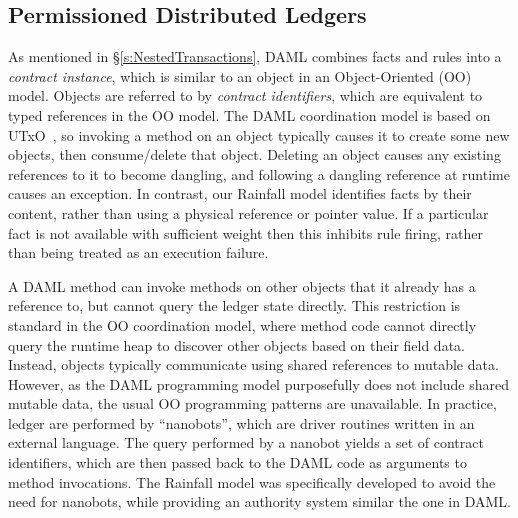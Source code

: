


\subsection{Permissioned Distributed Ledgers}
\label{s:RelatedPermissioned}
As mentioned in \S\ref{s:NestedTransactions}, DAML combines facts and rules into a \emph{contract instance}, which is similar to an object in an Object-Oriented (OO) model. Objects are referred to by \emph{contract identifiers}, which are equivalent to typed references in the OO model. The DAML coordination model is based on UTxO~\cite{Zahnentferner2018:UTxO}, so invoking a method on an object typically causes it to create some new objects, then consume/delete that object. Deleting an object causes any existing references to it to become dangling, and following a dangling reference at runtime causes an exception. In contrast, our Rainfall model identifies facts by their content, rather than using a physical reference or pointer value. If a particular fact is not available with sufficient weight then this inhibits rule firing, rather than being treated as an execution failure.

A DAML method can invoke methods on other objects that it already has a reference to, but cannot query the ledger state directly. This restriction is standard in the OO coordination model, where method code cannot directly query the runtime heap to discover other objects based on their field data. Instead, objects typically communicate using shared references to mutable data. However, as the DAML programming model purposefully does not include shared mutable data, the usual OO programming patterns are unavailable. In practice, ledger are performed by ``nanobots'', which are driver routines written in an external language. The query performed by a nanobot yields a set of contract identifiers, which are then passed back to the DAML code as arguments to method invocations. The Rainfall model was specifically developed to avoid the need for nanobots, while providing an authority system similar the one in DAML.

